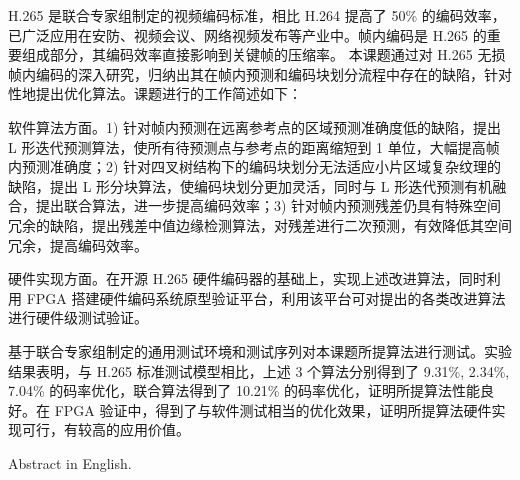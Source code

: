 \begin{cabstract}
    H.265 是联合专家组制定的视频编码标准，相比 H.264 提高了 50\% 的编码效率，已广泛应用在安防、视频会议、网络视频发布等产业中。帧内编码是 H.265 的重要组成部分，其编码效率直接影响到关键帧的压缩率。    
    本课题通过对 H.265 无损帧内编码的深入研究，归纳出其在帧内预测和编码块划分流程中存在的缺陷，针对性地提出优化算法。课题进行的工作简述如下：

    软件算法方面。1) 针对帧内预测在远离参考点的区域预测准确度低的缺陷，提出 L 形迭代预测算法，使所有待预测点与参考点的距离缩短到 1 单位，大幅提高帧内预测准确度；2) 针对四叉树结构下的编码块划分无法适应小片区域复杂纹理的缺陷，提出 L 形分块算法，使编码块划分更加灵活，同时与 L 形迭代预测有机融合，提出联合算法，进一步提高编码效率；3) 针对帧内预测残差仍具有特殊空间冗余的缺陷，提出残差中值边缘检测算法，对残差进行二次预测，有效降低其空间冗余，提高编码效率。

    硬件实现方面。在开源 H.265 硬件编码器的基础上，实现上述改进算法，同时利用 FPGA 搭建硬件编码系统原型验证平台，利用该平台可对提出的各类改进算法进行硬件级测试验证。

    基于联合专家组制定的通用测试环境和测试序列对本课题所提算法进行测试。实验结果表明，与 H.265 标准测试模型相比，上述 3 个算法分别得到了 9.31\%, 2.34\%, 7.04\% 的码率优化，联合算法得到了 10.21\% 的码率优化，证明所提算法性能良好。在 FPGA 验证中，得到了与软件测试相当的优化效果，证明所提算法硬件实现可行，有较高的应用价值。
\end{cabstract}


\begin{eabstract}
    Abstract in English.
\end{eabstract}

